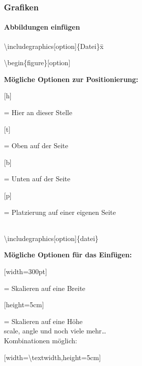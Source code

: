 \begin{frame}
\frametitle{Grafiken}
\framesubtitle{Abbildungen einfügen}
\begin{tabbing}
\textbackslash includegraphics[option]\{Datei\}x\=\kill
\hspace{-10mm}
\begin{ttfamily}
\color{unibablueI}\textbackslash begin\color{black}\{figure\}\color{nounibagreenI}[option]\color{black}
\end{ttfamily}
\>\textbf{Mögliche Optionen zur Positionierung:}\\
\>\begin{ttfamily}\color{nounibagreenI}[h]\color{black}\end{ttfamily} = Hier an dieser Stelle\\
\>\begin{ttfamily}\color{nounibagreenI}[t]\color{black}\end{ttfamily} = Oben auf der Seite\\
\>\begin{ttfamily}\color{nounibagreenI}[b]\color{black}\end{ttfamily} = Unten auf der Seite\\
\>\begin{ttfamily}\color{nounibagreenI}[p]\color{black}\end{ttfamily} = Platzierung auf einer eigenen
Seite\\[5mm]
~\\[5mm]
\hspace{-10mm}
\begin{ttfamily}
\small\color{nounibaredI}\textbackslash includegraphics\color{nounibagreenI}[option]\color{black}\{datei\}
\end{ttfamily}
\>\textbf{Mögliche Optionen für das Einfügen:}\\
\>\begin{ttfamily}\color{nounibagreenI}[width=300pt]\color{black}\end{ttfamily}= Skalieren auf eine Breite\\
\>\begin{ttfamily}\color{nounibagreenI}[height=5cm]\color{black}\end{ttfamily}= Skalieren auf eine Höhe\\
\>scale, angle und noch viele mehr\ldots\\
\>Kombinationen möglich:\\
\>\begin{ttfamily}\color{nounibagreenI}[width=\textbackslash textwidth,height=5cm]\color{black}\end{ttfamily}
\end{tabbing}
\end{frame}


